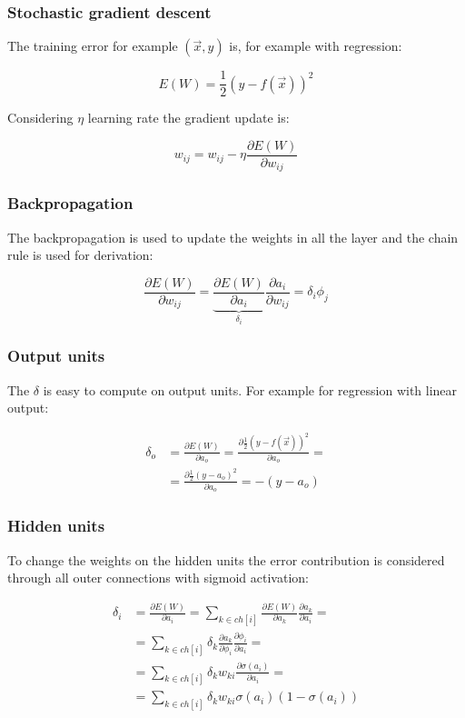 		\subsubsection{Stochastic gradient descent}
		The training error for example $(\vec{x},y)$ is, for example with regression:

		$$E(W) = \frac{1}{2}(y-f(\vec{x}))^2$$

		Considering $\eta$ learning rate the gradient update is:

		$$w_{ij} = w_{ij}-\eta\frac{\partial E(W)}{\partial w_{ij}}$$

		\subsubsection{Backpropagation}
		The backpropagation is used to update the weights in all the layer and the chain rule is used for derivation:

		$$\frac{\partial E(W)}{\partial w_{ij}} = \underbrace{\frac{\partial E(W)}{\partial a_i}}_{\delta_i}\frac{\partial a_i}{\partial w_{ij}} = \delta_i\phi_j$$

		\subsubsection{Output units}
		The $\delta$ is easy to compute on output units.
		For example for regression with linear output:

		\begin{align*}
			\delta_o &= \frac{\partial E(W)}{\partial a_o} = \frac{\partial\frac{1}{2}(y-f(\vec{x}))^2}{\partial a_o}=\\
				 &=\frac{\partial \frac{1}{2}(y-a_o)^2}{\partial a_o} = -(y-a_o)
		\end{align*}

		\subsubsection{Hidden units}
		To change the weights on the hidden units the error contribution is considered through all outer connections with sigmoid activation:

		\begin{align*}
			\delta_i &= \frac{\partial E(W)}{\partial a_i}  = \sum\limits_{k\in ch[i]}\frac{\partial E(W)}{\partial a_k}\frac{\partial a_k}{\partial a_i}=\\
				 &=\sum\limits_{k\in ch[i]} \delta_k\frac{\partial a_k}{\partial\phi_i}\frac{\partial\phi_i}{\partial a_i}=\\
				 &=\sum\limits_{k\in ch[i]}\delta_kw_{ki}\frac{\partial\sigma(a_i)}{\partial a_i}=\\
				 &=\sum\limits_{k\in ch[i]}\delta_kw_{ki}\sigma(a_i)(1-\sigma(a_i))
		\end{align*}


